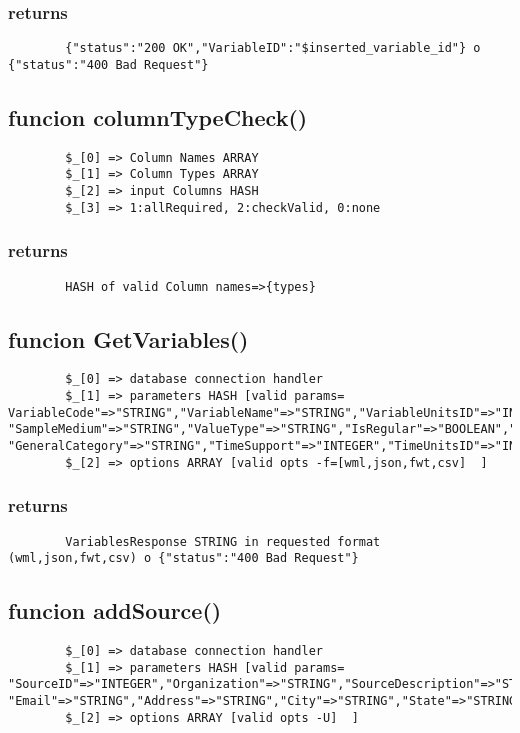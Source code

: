 \documentclass{article}
\begin{document}
\subsubsection*{returns\label{returns}}
\begin{verbatim}
        {"status":"200 OK","VariableID":"$inserted_variable_id"} o {"status":"400 Bad Request"}
\end{verbatim}
\subsection*{funcion columnTypeCheck()\label{funcion_columnTypeCheck_}}
\begin{verbatim}
        $_[0] => Column Names ARRAY
        $_[1] => Column Types ARRAY
        $_[2] => input Columns HASH
        $_[3] => 1:allRequired, 2:checkValid, 0:none
\end{verbatim}
\subsubsection*{returns\label{returns}}
\begin{verbatim}
        HASH of valid Column names=>{types}
\end{verbatim}
\subsection*{funcion GetVariables()\label{funcion_GetVariables_}}
\begin{verbatim}
        $_[0] => database connection handler
        $_[1] => parameters HASH [valid params=  VariableCode"=>"STRING","VariableName"=>"STRING","VariableUnitsID"=>"INTEGER", "SampleMedium"=>"STRING","ValueType"=>"STRING","IsRegular"=>"BOOLEAN","DataType"=>"STRING", "GeneralCategory"=>"STRING","TimeSupport"=>"INTEGER","TimeUnitsID"=>"INTEGER
        $_[2] => options ARRAY [valid opts -f=[wml,json,fwt,csv]  ]
\end{verbatim}
\subsubsection*{returns\label{returns}}
\begin{verbatim}
        VariablesResponse STRING in requested format (wml,json,fwt,csv) o {"status":"400 Bad Request"}
\end{verbatim}
\subsection*{funcion addSource()\label{funcion_addSource_}}
\begin{verbatim}
        $_[0] => database connection handler
        $_[1] => parameters HASH [valid params=  "SourceID"=>"INTEGER","Organization"=>"STRING","SourceDescription"=>"STRING","SourceLink"=>"STRING","ContactName"=>"STRING","Phone"=>"STRING", "Email"=>"STRING","Address"=>"STRING","City"=>"STRING","State"=>"STRING","ZipCode"=>"STRING","Citation"=>"STRING","MetadataID"=>"INTEGER"
        $_[2] => options ARRAY [valid opts -U]  ]
\end{verbatim}
\end{document}
